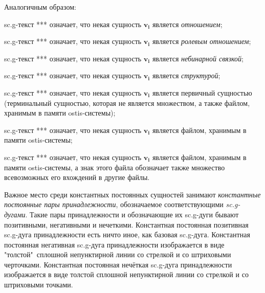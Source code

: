\begin{SCn}
{Аналогичным образом: 
\begin{scnitemize}
\item sc.g-текст *** означает, что некая сущность $\bm{v_i}$ является \textit{отношением}; 
\item sc.g-текст *** означает, что некая сущность $\bm{v_i}$ является \textit{ролевым отношением}; 
\item sc.g-текст *** означает, что некая сущность $\bm{v_i}$ является \textit{небинарной связкой}; 
\item sc.g-текст *** означает, что некая сущность $\bm{v_i}$ является \textit{структурой}; 
\item sc.g-текст *** означает, что некая сущность $\bm{v_i}$ является первичный сущностью (терминальный сущностью, которая не является множеством, а также файлом, хранимым в памяти ostis-системы); 
\item sc.g-текст *** означает, что некая сущность $\bm{v_i}$ является файлом, хранимым в памяти ostis-системы;
\item sc.g-текст *** означает, что некая сущность $\bm{v_i}$ является файлом, хранимым в памяти ostis-системы, а знак этого файла обозначает также множество всевозможных его вхождений в другие файлы. 
\end{scnitemize}

Важное место среди константных постоянных сущностей занимают \textit{константные постоянные пары принадлежности}, обозначаемое соответствующими \textit{sc.g-дугами}. Такие пары принадлежности и обозначающие их sc.g-дуги бывают позитивными, негативными и нечеткими. Константная постоянная позитивная sc.g-дуга принадлежности есть ничто иное, как базовая sc.g-дуга. Константная постоянная негативная sc.g-дуга принадлежности изображается в виде "толстой"\ сплошной непунктирной линии со стрелкой и со штриховыми черточками. Константная постоянная нечёткая sc.g-дуга принадлежности изображается в виде толстой сплошной непунктирной линии со стрелкой и со штриховыми точками.}

\scnendstruct


\end{SCn}
